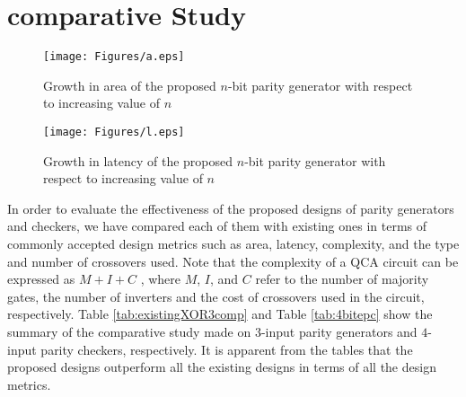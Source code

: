\documentclass[conference]{IEEEtran}
\begin{document}
\section{comparative Study}
\label{sec:comparison}

\begin{figure}[ht!]
\texttt{[image: Figures/a.eps]}
\caption{\small Growth in area of the proposed $n$-bit parity generator with respect to increasing value of $n$}
\label{fig:growthArea}
\end{figure}

\begin{figure}[ht!]
\texttt{[image: Figures/l.eps]}
\caption{\small Growth in latency of the proposed $n$-bit parity generator with respect to increasing value of $n$}
\label{fig:growthLatency}
\end{figure}
In order to evaluate the effectiveness of the proposed designs of parity generators and checkers, we have compared each of them with existing ones in terms of commonly accepted design metrics such as area, latency, complexity, and the type and number of crossovers used.
Note that the complexity of a QCA circuit can be expressed as $M + I + C$ \cite{Liu_tnano2014}, where $M$, $I$, and $C$ refer to the number of majority gates, the number of inverters and the cost of crossovers used in the circuit, respectively.
Table \ref{tab:existingXOR3comp} and Table \ref{tab:4bitepc} show the summary of the comparative study made on $3$-input parity generators and $4$-input parity checkers, respectively.
It is apparent from the tables that the proposed designs outperform all the existing designs in terms of all the design metrics. 
\end{document}
